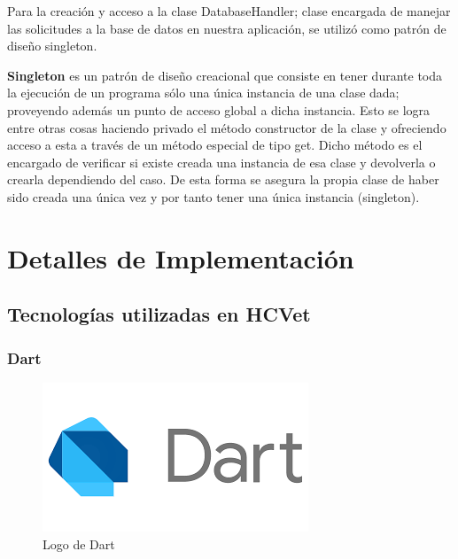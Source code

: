 Para la creación y acceso a la clase DatabaseHandler; clase encargada de manejar las solicitudes a la base de datos en nuestra aplicación, se utilizó como patrón de diseño singleton. 

\textbf{Singleton}  es un patrón de diseño creacional que consiste en tener durante toda la ejecución de un programa sólo una única instancia de una clase dada; proveyendo además un punto de acceso global a dicha instancia. Esto se logra entre otras cosas haciendo privado el método constructor de la clase y ofreciendo acceso a esta a través de un método especial de tipo get. Dicho método es el encargado de verificar si existe creada una instancia de esa clase y devolverla o crearla dependiendo del caso. De esta forma se asegura la propia clase de haber sido creada una única vez y por tanto tener una única instancia (singleton).



\chapter{Detalles de Implementación}
\label{chapter:implementation}


\section{Tecnologías utilizadas en HCVet}


\subsection{Dart}


\begin{figure}[h!]
\begin{center}
\includegraphics[scale=0.4]{Graphics/images/LogoDart.png}
\caption{Logo de Dart}
\label{fig:rcm}

\end{center}
\end{figure}

